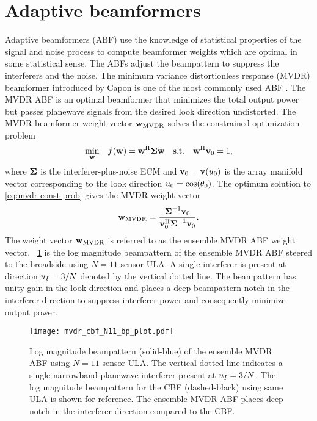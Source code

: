 \section{Adaptive beamformers}
\label{sec:abf}
Adaptive beamformers (ABF) use the knowledge of statistical properties
of the signal and noise process to compute beamformer weights which
are optimal in some statistical sense. The ABFs adjust the beampattern
to suppress the interferers and the noise. The minimum variance
distortionless response (MVDR) beamformer introduced by Capon is one
of the most commonly used ABF \cite{capon1969mvdr}. The MVDR ABF is an
optimal beamformer that minimizes the total output power but
passes planewave signals from the desired look direction
undistorted. The MVDR beamformer weight vector ${\bf w}_{\rm MVDR}$ solves the
constrained optimization problem
\begin{equation}
  \label{eq:mvdr-const-prob}
  \underset{{\bf w}}\min \quad f({\bf w}) = 
{\bf w}^{\rm H}\boldsymbol{\Sigma}{\bf w} \quad \text{s.t.} \quad {\bf w}^{\rm H}{\bf v}_0 = 1,
\end{equation}
where $\boldsymbol{\Sigma}$ is the interferer-plus-noise ECM and
${\bf v}_0 = {\bf v}(u_0)$ is the array manifold vector corresponding
to the look direction $u_0 = \cos(\theta_0)$. The optimum solution
to \eqref{eq:mvdr-const-prob} gives the MVDR weight vector
\begin{equation}
  \label{eq:mvdr-wt} 
{\bf w}_{\rm MVDR} =
\frac{\boldsymbol{\Sigma}^{-1}{\bf v}_0}{{\bf v}_0^{\rm H}\boldsymbol{\Sigma}^{-1}{\bf v}_0}.
\end{equation}
The weight vector ${\bf w}_{\rm MVDR}$ is referred to as the ensemble MVDR ABF
weight vector. \figurename{}~\ref{fig:mvdr-beampattern} is the log
magnitude beampattern of the ensemble MVDR ABF steered to the
broadside using $N = 11$ sensor ULA. A single interferer is present at
direction $u_I = 3/N$ denoted by the vertical dotted line. The
beampattern has unity gain in the look direction and places a deep
beampattern notch in the interferer direction to suppress interferer
power and consequently minimize output power.


\begin{figure}[!hp]
 \centering
    \texttt{[image: mvdr\_cbf\_N11\_bp\_plot.pdf]}
    \caption[Log magnitude beampattern (solid-blue) of the ensemble MVDR ABF using $N = 11$ sensor ULA.]{Log magnitude beampattern (solid-blue) of the ensemble MVDR ABF using $N = 11$ sensor ULA. The vertical dotted line indicates a single narrowband planewave interferer present at $u_I = 3/N$. The log magnitude beampattern for the CBF (dashed-black) using same ULA is shown for reference. The ensemble MVDR ABF places deep notch in the interferer direction compared to the CBF.} 
    \label{fig:mvdr-beampattern}
\end{figure}

